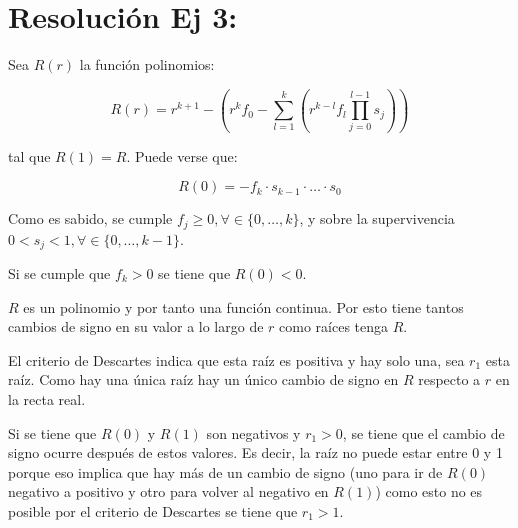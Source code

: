 \documentclass[twocolumn,aps,prl]{revtex4-1}
\begin{document}
% 
%                                 
% 

\section{Resolución Ej 3:}

Sea $R(r)$ la función polinomios:

\begin{equation}\label{eqn:etiqueta1}
    R(r) = r^{k+1} 
        - \left( 
            r^k f_0 
            - \sum_{l=1}^k 
            \left( 
            r^{k-l} f_l \prod_{j=0}^{l-1} s_j  
            \right) 
        \right)
\end{equation}

tal que $R(1)=R$. Puede verse que:

\begin{equation}\label{eqn:etiqueta2}
    R(0) = - f_k \cdot  s_{k-1} \cdot \ldots \cdot s_{0}
\end{equation}

Como es sabido, se cumple $f_j \geq 0, \forall \in \lbrace 0, \ldots, k \rbrace$, y sobre la supervivencia $  0 < s_j < 1, \forall \in \lbrace 0, \ldots, k - 1 \rbrace$.

Si se cumple que $f_k > 0$ se tiene que $R(0) < 0$. 

$R$ es un polinomio y por tanto una función continua. Por esto tiene tantos cambios de signo en su valor a lo largo de $r$ como raíces tenga $R$. 

El criterio de Descartes indica que esta raíz es positiva y hay solo una, sea $r_1$ esta raíz. Como hay una única raíz hay un único cambio de signo en $R$ respecto a $r$ en la recta real. 

Si se tiene que $R(0)$ y $R(1)$ son negativos y $r_1>0$, se tiene que el cambio de signo ocurre después de estos valores. Es decir, la raíz no puede estar entre 0 y 1 porque eso implica que hay más de un cambio de signo (uno para ir de $R(0)$ negativo a positivo y otro para volver al negativo en $R(1)$) como esto no es posible por el criterio de Descartes se tiene que $r_1>1$.

% 
%                             
% 
\end{document}
